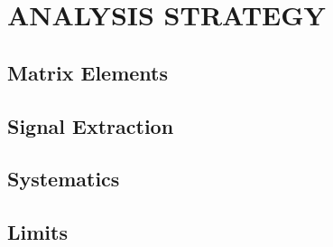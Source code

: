 %
%
%



\chapter{\uppercase {Analysis Strategy}}

\section{Matrix Elements}

\section{Signal Extraction}

\section{Systematics}

\section{Limits}


